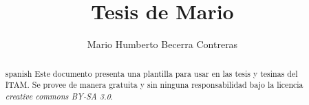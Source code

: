 \documentclass{tesisITAM}
\title{Tesis de Mario}
\author{Mario Humberto Becerra Contreras}
\begin{document}
	\npthousandsep{,}
	\maketitle
	\publicationrights


	\begin{abstract}{spanish}
		Este documento presenta una plantilla para usar en las tesis y tesinas del ITAM. Se provee de manera gratuita y sin ninguna responsabilidad bajo la licencia \emph{creative commons BY-SA 3.0}.
	\end{abstract}

	\setcounter{page}{1}

	\tableofcontents
	\listoffigures
	\listoftables
	\newpage

	\setcounter{page}{1}


	
	
	
	
	
	

	

	
	
	

	\appendix

	\clearpage
	
\end{document}
